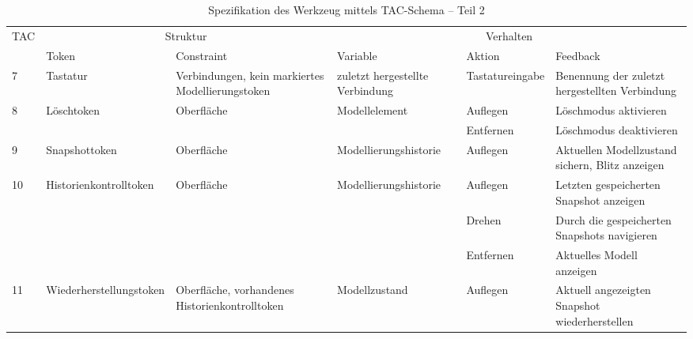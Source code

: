 \begin{table}[htbp]
	\centering
	\caption{Spezifikation des Werkzeug mittels TAC-Schema -- Teil 2}
\begin{tabular}{| p{0.8cm} || p{2.2cm} | p{2cm} || p{2cm} | p{2cm} | p{3cm} |}
  \hline
	TAC & \multicolumn{2}{|c||}{Struktur} & \multicolumn{3}{c|}{Verhalten} \\ 
	& Token & Constraint & Variable & Aktion & Feedback \\ \hline \hline
	7 & Tastatur & Verbind\-ungen, kein markiertes Modell\-ierungs\-token & zuletzt hergestellte Verbindung & Tastatur\-eingabe & Benennung der zuletzt hergestellten Verbindung \\ \hline
	\multirow{2}{*}{8} & Lösch\-token & Oberfläche & Modell\-element & Auflegen & Löschmodus aktivieren \\ \cline{5-6}
	 				   &    	& 			 &  & Entfernen & Löschmodus deaktivieren \\ \hline
	9 & Snapshot\-token & Oberfläche & Modell\-ierungs\-historie & Auflegen & Aktuellen Modellzustand sichern, Blitz anzeigen \\ \hline
	\multirow{3}{*}{10} & Historien\-kontroll\-token & Oberfläche & Modell\-ierungs\-historie  & Auflegen & Letzten gespeicherten Snapshot anzeigen \\ \cline{5-6}
					   &   &			 &  & Drehen & Durch die gespeicherten Snapshots navigieren \\ \cline{5-6}
					   &   &			 &  & Entfernen & Aktuelles Modell anzeigen \\ \hline
	11 & Wieder\-herstellungs\-token & Oberfläche, vorhandenes Historien\-kontroll\-token & Modell\-zustand & Auflegen & Aktuell angezeigten Snapshot wiederherstellen \\ \hline
\end{tabular} \\
	\label{tab:tac2}
\end{table}

